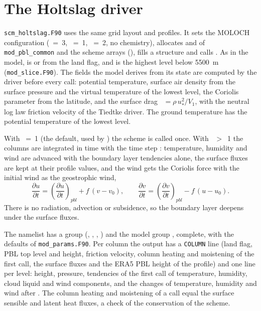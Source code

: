 \section{The Holtslag driver}

\verb=scm_holtslag.F90= uses the same grid layout and profiles. It sets the
MOLOCH configuration (~=~3, ~=~1,
~=~2, no chemistry), allocates  and 
of \verb=mod_pbl_common= and the scheme arrays
(), fills a 
structure and calls . As in the model,  is
 or  from the land flag, and
 is the highest level below 5500~m (\verb=mod_slice.F90=).
The fields the model derives from its state are computed by the driver
before every call: potential temperature, surface air density from the
surface pressure and the virtual temperature of the lowest level, the
Coriolis parameter from the latitude, and the surface drag
~$= \rho\,u_*^2/V_1$, with the neutral log law friction
velocity of the Tiedtke driver. The ground temperature has the potential
temperature of the lowest level.

With ~=~1 (the default, used by ) the
scheme is called once. With ~$>$~1 the columns are
integrated in time with the time step : temperature,
humidity and wind are advanced with the boundary layer tendencies alone,
the surface fluxes are kept at their profile values, and the wind gets
the Coriolis force with the initial wind as the geostrophic wind,
\begin{equation}
  \frac{\partial u}{\partial t} = \left(\frac{\partial u}{\partial t}
  \right)_{pbl} + f\,(v - v_0), \qquad
  \frac{\partial v}{\partial t} = \left(\frac{\partial v}{\partial t}
  \right)_{pbl} - f\,(u - u_0) .
\end{equation}
There is no radiation, advection or subsidence, so the boundary layer
deepens under the surface fluxes.

The namelist has a  group (, ,
, ) and the model group ,
complete, with the defaults of \verb=mod_params.F90=. Per column the
output has a \verb=COLUMN= line (land flag, PBL top level and height,
friction velocity, column heating and moistening of the first call, the
surface fluxes and the ERA5 PBL height of the profile) and one line per
level: height, pressure, tendencies of the first call of temperature,
humidity, cloud liquid and wind components, and the changes of
temperature, humidity and wind after . The column heating
and moistening of a call equal the surface sensible and latent heat
fluxes, a check of the conservation of the scheme.

